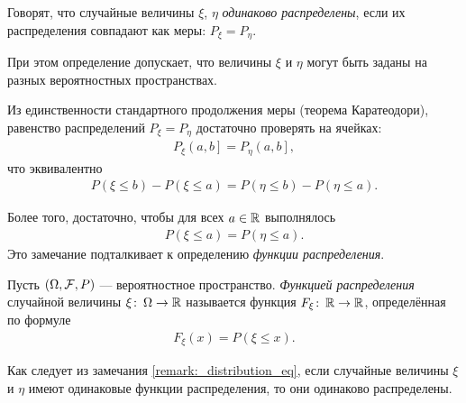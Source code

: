 \documentclass[../main.tex]{subfiles}
\begin{document}
\begin{df}
 Говорят, что случайные величины $\xi$, $\eta$ \textit{одинаково распределены}, если их распределения совпадают как меры: $P_{\xi} = P_{\eta}$.

 При этом определение допускает, что величины $ \xi $ и $ \eta $ могут быть заданы на разных вероятностных пространствах.
\end{df}
\begin{remrk}
 \label{remark:_distribution_eq}
 Из единственности стандартного продолжения меры (теорема Каратеодори), равенство распределений $P_{\xi} = P_{\eta}$  достаточно проверять на ячейках:
 \begin{align*}
  P_{\xi} \left(a, b\right] = P_{\eta} \left(a, b\right]  
  ,\end{align*} что эквивалентно \begin{align*}
  P(\xi \leqslant b) - P(\xi \leqslant a) =  P(\eta \leqslant b) - P(\eta \leqslant a).
 \end{align*}

 Более того, достаточно, чтобы для всех $a \in \mathbb{R}$ выполнялось
 \begin{align*}
  P(\xi \leqslant a) = P(\eta \leqslant a).
 \end{align*} Это замечание подталкивает к определению \textit{функции распределения}.
\end{remrk}
\begin{df}
 Пусть $ (\Omega,\mathcal F,P) $ --- вероятностное пространство. \textit{Функцией распределения} случайной величины $\xi \colon\,\Omega\to\mathbb{R}$ называется функция $F_{\xi} \colon\, \mathbb{R} \to \mathbb{R}$, определённая по формуле
 \begin{align*}
  F_{\xi}(x) = P(\xi \leqslant x).
 \end{align*} 
\end{df}
\begin{remrk}
 Как следует из замечания \ref{remark:_distribution_eq}, если случайные величины $ \xi $ и $ \eta $ имеют одинаковые функции распределения, то они одинаково распределены.
\end{remrk}
\end{document}
